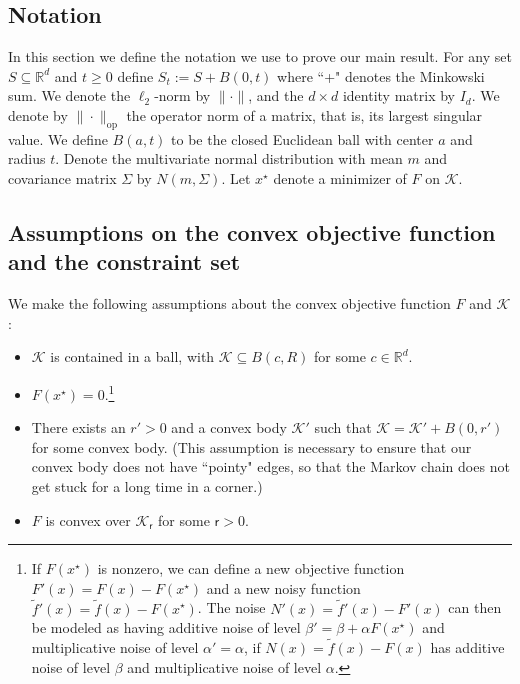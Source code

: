 \documentclass[final,12pt]{colt2018} %
\begin{document}
{\subsection{Notation}\label{sec:notation}
In this section we define the notation we use to prove our main result.
%
 For any set $S\subseteq \mathbb{R}^d$ and $t\geq 0$ define $S_t := S +B(0,t)$ where ``+" denotes the Minkowski sum.
 We denote the $\ell_2$-norm by $\|\cdot \|$, and the $d\times d$ identity matrix by $I_d$.
 We denote by $ \|\cdot \|_{\mathrm{op}}$ the operator norm of a matrix, that is, its largest singular value.
 We define $B(a,t)$ to be the closed Euclidean ball with center $a$ and radius $t$.
Denote the multivariate normal distribution with mean $m$ and covariance matrix $\Sigma$ by $N(m,\Sigma)$.
%
Let $x^\star$ denote a minimizer of $F$ on $\mathcal{K}$.

\subsection{Assumptions on the convex objective function and the constraint set}
We make the following assumptions about the convex objective function $F$ and  $\mathcal{K}$:
\begin{itemize}

\item  $\mathcal{K}$ is contained in a ball, with $\mathcal{K} \subseteq B(c,R)$ for some $c \in \mathbb{R}^d$.

\item $F(x^\star) = 0$.\footnote{If $F(x^\star)$ is nonzero, we can define a new objective function $F'(x) = F(x)-F(x^\star)$ and a new noisy function $\tilde{f}'(x) =\tilde{f}(x)-F(x^\star)$.
%
The noise $N'(x)= \tilde{f}'(x) -F'(x)$ can then be modeled as having additive noise  of level $\beta' = \beta + \alpha F(x^\star)$ and multiplicative noise of level $\alpha'= \alpha$, if $N(x) = \tilde{f}(x)- F(x)$ has additive noise of level $\beta$ and multiplicative noise of level $\alpha$.}


%


\item There exists  an $r' > 0$  and a convex body $\mathcal{K}'$ such that   $\mathcal{K}=  \mathcal{K}' +B(0,r')$ for some convex body.
%
(This assumption is necessary to ensure that our convex body does not have ``pointy" edges, so that the Markov chain does not get stuck for a long time in a corner.)
%

\item $F$ is  convex over  $\mathcal{K}_{\mathsf{r}}$ for some $\mathsf{r}>0$.
  

\end{itemize}}
\end{document}
